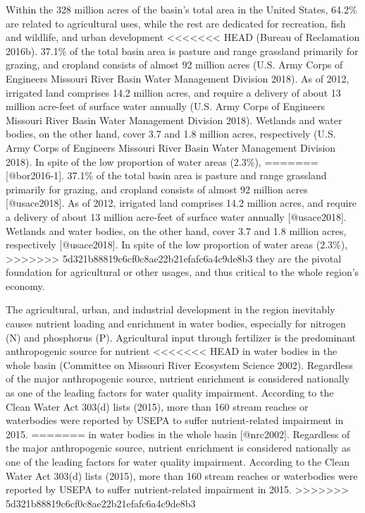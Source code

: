 \documentclass[12pt,]{article}
\begin{document}
Within the 328 million acres of the basin's total area in the United
States, 64.2\% are related to agricultural uses, while the rest are
dedicated for recreation, fish and wildlife, and urban development
<<<<<<< HEAD
(Bureau of Reclamation 2016b). 37.1\% of the total basin area is pasture
and range grassland primarily for grazing, and cropland consists of
almost 92 million acres (U.S. Army Corps of Engineers Missouri River
Basin Water Management Division 2018). As of 2012, irrigated land
comprises 14.2 million acres, and require a delivery of about 13 million
acre-feet of surface water annually (U.S. Army Corps of Engineers
Missouri River Basin Water Management Division 2018). Wetlands and water
bodies, on the other hand, cover 3.7 and 1.8 million acres, respectively
(U.S. Army Corps of Engineers Missouri River Basin Water Management
Division 2018). In spite of the low proportion of water areas (2.3\%),
=======
{[}@bor2016-1{]}. 37.1\% of the total basin area is pasture and range
grassland primarily for grazing, and cropland consists of almost 92
million acres {[}@usace2018{]}. As of 2012, irrigated land comprises
14.2 million acres, and require a delivery of about 13 million acre-feet
of surface water annually {[}@usace2018{]}. Wetlands and water bodies,
on the other hand, cover 3.7 and 1.8 million acres, respectively
{[}@usace2018{]}. In spite of the low proportion of water areas (2.3\%),
>>>>>>> 5d321b88819c6cf0c8ae22b21efafc6a4c9de8b3
they are the pivotal foundation for agricultural or other usages, and
thus critical to the whole region's economy.

The agricultural, urban, and industrial development in the region
inevitably causes nutrient loading and enrichment in water bodies,
especially for nitrogen (N) and phosphorus (P). Agricultural input
through fertilizer is the predominant anthropogenic source for nutrient
<<<<<<< HEAD
in water bodies in the whole basin (Committee on Missouri River
Ecosystem Science 2002). Regardless of the major anthropogenic source,
nutrient enrichment is considered nationally as one of the leading
factors for water quality impairment. According to the Clean Water Act
303(d) lists (2015), more than 160 stream reaches or waterbodies were
reported by USEPA to suffer nutrient-related impairment in 2015.
=======
in water bodies in the whole basin {[}@nrc2002{]}. Regardless of the
major anthropogenic source, nutrient enrichment is considered nationally
as one of the leading factors for water quality impairment. According to
the Clean Water Act 303(d) lists (2015), more than 160 stream reaches or
waterbodies were reported by USEPA to suffer nutrient-related impairment
in 2015.
>>>>>>> 5d321b88819c6cf0c8ae22b21efafc6a4c9de8b3
\end{document}
